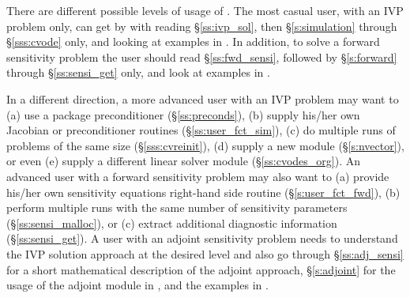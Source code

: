 There are different possible levels of usage of {\cvodes}. The most casual
user, with an IVP problem only, can get by with reading \S\ref{ss:ivp_sol}, 
then \S\ref{s:simulation} through \S\ref{sss:cvode} only, and looking at examples 
in \cite{cvodes2.1.0_ex}.
In addition, to solve a forward sensitivity problem the user should read 
\S\ref{ss:fwd_sensi}, followed by \S\ref{s:forward} through 
\S\ref{ss:sensi_get} only, and look at examples in \cite{cvodes2.1.0_ex}.

In a different direction, a more advanced user with an IVP problem may want to 
(a) use a package preconditioner (\S\ref{ss:preconds}), 
(b) supply his/her own Jacobian or preconditioner routines (\S\ref{ss:user_fct_sim}),
(c) do multiple runs of problems of the same size (\S\ref{sss:cvreinit}), 
(d) supply a new {\nvector} module (\S\ref{s:nvector}), or even 
(e) supply a different linear solver module (\S\ref{ss:cvodes_org}).
An advanced user with a forward sensitivity problem may also want to
(a) provide his/her own sensitivity equations right-hand side routine
(\S\ref{s:user_fct_fwd}), (b) perform multiple runs with the same number of
sensitivity parameters (\S\ref{ss:sensi_malloc}), or (c) extract additional
diagnostic information (\S\ref{ss:sensi_get}).
A user with an adjoint sensitivity problem needs to understand the IVP 
solution approach at the desired level and also go through 
\S\ref{ss:adj_sensi} for a short mathematical description of the adjoint
approach, \S\ref{s:adjoint} for the usage of the adjoint module in {\cvodes},
and the examples in \cite{cvodes2.1.0_ex}.

